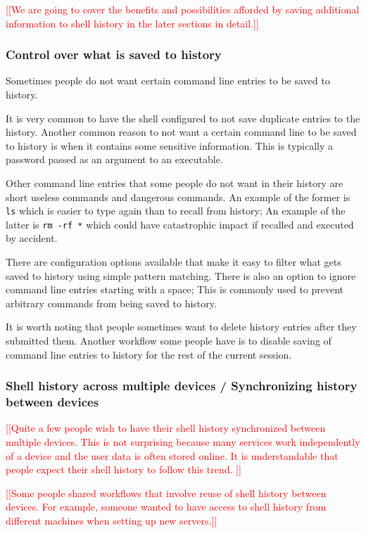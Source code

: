\documentclass[thesis=M,english]{FITthesis}[2012/10/20]
\newcommand{\redtext}[1]{\textcolor{red}{[[#1]]}}
\begin{document}
\redtext{We are going to cover the benefits and possibilities afforded by saving additional information to shell history in the later sections in detail.}

\subsubsection*{Control over what is saved to history}
Sometimes people do not want certain command line entries to be saved to history. 

It is very common to have the shell configured to not save duplicate entries to the history.  
Another common reason to not want a certain command line to be saved to history is when it contains some sensitive information. This is typically a password passed as an argument to an executable.

Other command line entries that some people do not want in their history are short useless commands and dangerous commands. An example of the former is \verb|ls| which is easier to type again than to recall from history; An example of the latter is \verb|rm -rf *| which could have catastrophic impact if recalled and executed by accident.

There are configuration options available that make it easy to filter what gets saved to history using simple pattern matching. There is also an option to ignore command line entries starting with a space; This is commonly used to prevent arbitrary commands from being saved to history.

It is worth noting that people sometimes want to delete history entries after they submitted them. Another workflow some people have is to disable saving of command line entries to history for the rest of the current session.

\subsubsection*{Shell history across multiple devices / Synchronizing history between devices}

\redtext{Quite a few people wish to have their shell history synchronized between multiple devices. This is not surprising because many services work independently of a device and the user data is often stored online. It is understandable that people expect their shell history to follow this trend.  }

\redtext{Some people shared workflows that involve reuse of shell history between devices. For example, someone wanted to have access to shell history from different machines when setting up new servers.}
\end{document}
